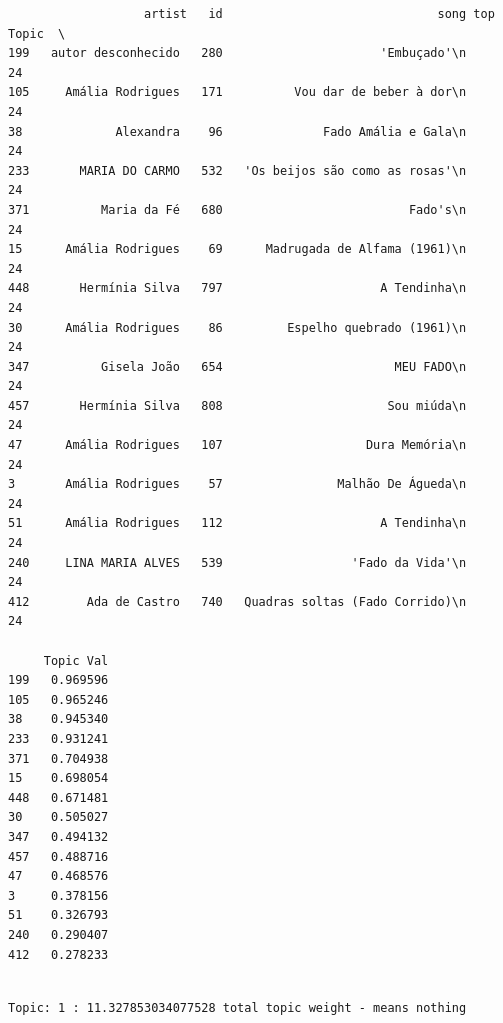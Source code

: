 \documentclass[11pt]{article}
\begin{document}
    
    \begin{verbatim}
                   artist   id                              song top Topic  \
199   autor desconhecido   280                      'Embuçado'\n        24   
105     Amália Rodrigues   171          Vou dar de beber à dor\n        24   
38             Alexandra    96              Fado Amália e Gala\n        24   
233       MARIA DO CARMO   532   'Os beijos são como as rosas'\n        24   
371          Maria da Fé   680                          Fado's\n        24   
15      Amália Rodrigues    69      Madrugada de Alfama (1961)\n        24   
448       Hermínia Silva   797                      A Tendinha\n        24   
30      Amália Rodrigues    86         Espelho quebrado (1961)\n        24   
347          Gisela João   654                        MEU FADO\n        24   
457       Hermínia Silva   808                       Sou miúda\n        24   
47      Amália Rodrigues   107                    Dura Memória\n        24   
3       Amália Rodrigues    57                Malhão De Águeda\n        24   
51      Amália Rodrigues   112                      A Tendinha\n        24   
240     LINA MARIA ALVES   539                  'Fado da Vida'\n        24   
412        Ada de Castro   740   Quadras soltas (Fado Corrido)\n        24   

     Topic Val  
199   0.969596  
105   0.965246  
38    0.945340  
233   0.931241  
371   0.704938  
15    0.698054  
448   0.671481  
30    0.505027  
347   0.494132  
457   0.488716  
47    0.468576  
3     0.378156  
51    0.326793  
240   0.290407  
412   0.278233  
    \end{verbatim}

    
    \begin{Verbatim}[commandchars=\\\{\}]

Topic: 1 : 11.327853034077528 total topic weight - means nothing

    \end{Verbatim}
\end{document}
